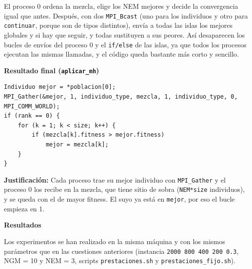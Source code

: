 \documentclass[12pt]{article}
\begin{document}
\begin{enumerate}
El proceso 0 ordena la mezcla, elige los NEM mejores y decide la convergencia igual que antes. Después, con dos \texttt{MPI\_Bcast} (uno para los individuos y otro para \texttt{continuar}, porque son de tipos distintos), envía a todas las islas los mejores globales y si hay que seguir, y todas sustituyen a sus peores. Así desaparecen los bucles de envíos del proceso 0 y el \texttt{if/else} de las islas, ya que todos los procesos ejecutan las mismas llamadas, y el código queda bastante más corto y sencillo.

\vspace{0.5cm}


\medskip
\noindent\textbf{Resultado final (\texttt{aplicar\_mh})}\par
\smallskip

\begin{lstlisting}[style=EstiloC]
Individuo mejor = *poblacion[0];
MPI_Gather(&mejor, 1, individuo_type, mezcla, 1, individuo_type, 0, MPI_COMM_WORLD);
if (rank == 0) {
	for (k = 1; k < size; k++) {
		if (mezcla[k].fitness > mejor.fitness)
			mejor = mezcla[k];
	}
}
\end{lstlisting}

\textbf{Justificación:} Cada proceso trae su mejor individuo con \texttt{MPI\_Gather} y el proceso 0 los recibe en la mezcla, que tiene sitio de sobra (\texttt{NEM*size} individuos), y se queda con el de mayor fitness. El suyo ya está en \texttt{mejor}, por eso el bucle empieza en 1.

\vspace{0.5cm}

\medskip
\noindent\textbf{Resultados}\par
\smallskip

Los experimentos se han realizado en la misma máquina y con los mismos parámetros que en las cuestiones anteriores (instancia \texttt{2000 800 400 200 0.3}, NGM = 10 y NEM = 3, scripts \texttt{prestaciones.sh} y \texttt{prestaciones\_fijo.sh}).


\end{enumerate}
\end{document}
